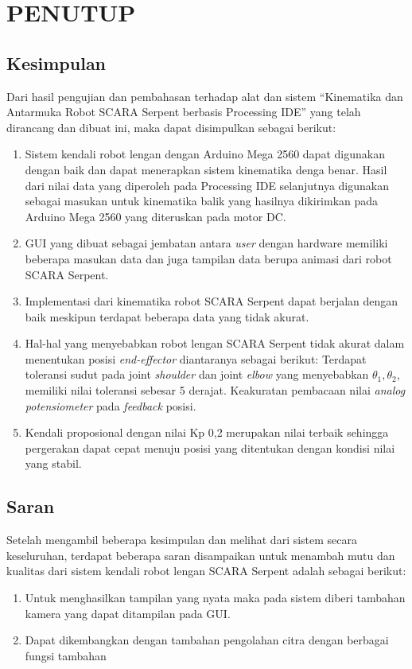 
\chapter{PENUTUP}
\section{Kesimpulan}
Dari hasil pengujian dan pembahasan terhadap alat dan sistem “Kinematika dan Antarmuka Robot SCARA Serpent berbasis Processing IDE” yang telah dirancang dan dibuat ini, maka dapat disimpulkan sebagai berikut:
\begin{enumerate}
	\item Sistem kendali robot lengan dengan Arduino Mega 2560 dapat digunakan dengan baik dan dapat menerapkan sistem kinematika denga benar. Hasil dari nilai data yang diperoleh pada Processing IDE selanjutnya digunakan sebagai masukan untuk kinematika balik yang hasilnya dikirimkan pada Arduino Mega 2560 yang diteruskan pada motor DC.
	\item GUI yang dibuat sebagai jembatan antara \textit{user} dengan hardware memiliki beberapa masukan data dan juga tampilan data berupa animasi dari robot SCARA Serpent.
	\item Implementasi dari kinematika robot SCARA Serpent dapat berjalan dengan baik meskipun terdapat beberapa data yang tidak akurat. 
	\item  Hal-hal yang menyebabkan robot lengan SCARA Serpent  tidak akurat dalam menentukan posisi \textit{end-effector} diantaranya sebagai berikut:
	\subitem  Terdapat toleransi sudut pada joint \textit{shoulder} dan joint \textit{elbow} yang menyebabkan $\theta_{1}, \theta_{2}$, memiliki nilai toleransi sebesar 5 derajat. 
	\subitem  Keakuratan  pembacaan nilai \textit{analog potensiometer} pada \textit{feedback} posisi. 
	\item  Kendali proposional dengan nilai Kp 0,2 merupakan nilai terbaik sehingga pergerakan dapat cepat menuju posisi yang ditentukan dengan kondisi nilai yang stabil.
\end{enumerate}

\section{Saran}
Setelah mengambil beberapa kesimpulan dan melihat dari sistem secara keseluruhan, terdapat beberapa saran disampaikan untuk menambah mutu dan kualitas dari sistem kendali robot lengan SCARA Serpent adalah sebagai berikut: 

\begin{enumerate}
	\item Untuk menghasilkan tampilan yang nyata maka pada sistem diberi tambahan kamera yang dapat ditampilan pada GUI.
	\item Dapat dikembangkan dengan tambahan pengolahan citra dengan berbagai fungsi tambahan
\end{enumerate}